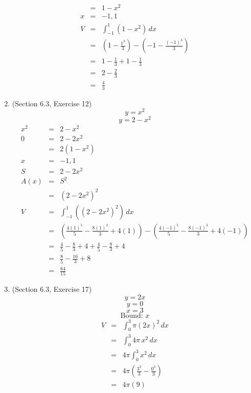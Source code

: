 \documentclass{article}
\begin{document}
\begin{enumerate}
\begin{eqnarray}
                 &=& 1 - x^2 \\
            x &=& -1, 1 \\
            V &=& \int_{-1}^1{\left(1 - x^2\right)\,dx} \\
              &=& \left(1 - \frac{1^3}{3}\right) - \left(-1 - \frac{(-1)^3}{3}\right) \\
              &=& 1 - \frac{1}{3} + 1 - \frac{1}{3} \\
              &=& 2 - \frac{2}{3} \\
              &=& \frac{4}{3}
        \end{eqnarray}
    \item (Section 6.3, Exercise 12)
        $$y = x^2$$
        $$y = 2 - x^2$$
        \begin{eqnarray}
            x^2 &=& 2 - x^2 \\
            0 &=& 2 - 2x^2 \\
              &=& 2\left(1 - x^2\right) \\
            x &=& -1, 1 \\
            S &=& 2 - 2x^2 \\
            A(x) &=& S^2 \\
                 &=& \left(2 - 2x^2\right)^2 \\
            V &=& \int_{-1}^1{\left(\left(2 - 2x^2\right)^2\right)\,dx} \\
              &=& \left(\frac{4(1)^5}{5} - \frac{8(1)^3}{3} + 4(1)\right) - \left(\frac{4(-1)^5}{5} - \frac{8(-1)^3}{3} + 4(-1)\right) \\
              &=& \frac{4}{5} - \frac{8}{3} + 4 + \frac{4}{5} - \frac{8}{3} + 4 \\
              &=& \frac{8}{5} - \frac{16}{3} + 8 \\
              &=& \frac{64}{15}
        \end{eqnarray}
    \item (Section 6.3, Exercise 17)
        $$y = 2x$$
        $$y = 0$$
        $$x = 3$$
        $$\text{Bound: } x$$
        \begin{eqnarray}
            V &=& \int_0^3{\pi\left(2x\right)^2\,dx} \\
              &=& \int_0^3{4\pi\,x^2\,dx} \\
              &=& 4\pi\int_0^3{x^2\,dx} \\
              &=& 4\pi\left(\frac{3^3}{3} - \frac{0^3}{3}\right) \\
              &=& 4\pi\left(9\right) \\

\end{eqnarray}
\end{enumerate}
\end{document}
